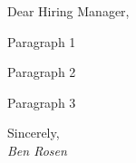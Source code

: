 \documentclass{letter}
\begin{document}
Dear Hiring Manager,

Paragraph 1

Paragraph 2

Paragraph 3

Sincerely, \\
\emph{Ben Rosen}
\end{document}
